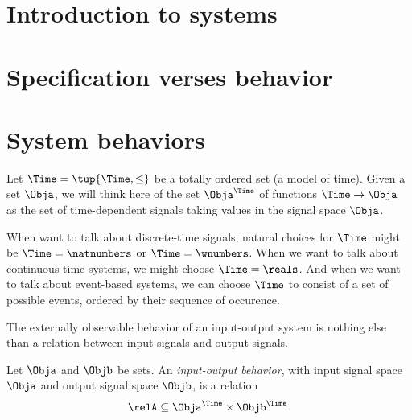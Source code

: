 
\section{Introduction to systems}



\section{Specification verses behavior}




\section{System behaviors}


Let $\Time = \tup{\Time, \leq}$ be a totally ordered set (a model of time). Given a set $\Obja$, we will think here of the set $\Obja^\Time$ of functions $\Time \to \Obja$ as the set of time-dependent signals taking values in the signal space $\Obja$. 

When want to talk about discrete-time signals, natural choices for $\Time$ might be $\Time = \natnumbers$ or $\Time = \wnumbers$. When we want to talk about continuous time systems, we might choose $\Time = \reals$. And when we want to talk about event-based systems, we can choose $\Time$ to consist of a set of possible events, ordered by their sequence of occurence. 

The externally observable behavior of an input-output system is nothing else than a relation between input signals and output signals. 

\begin{definition}
Let $\Obja$ and $\Objb$ be sets. An \emph{input-output behavior}, with input signal space $\Obja$ and output signal space $\Objb$, is a relation 
\begin{equation}
\relA \subseteq \Obja^\Time \times \Objb^\Time. 
\end{equation}
\end{definition}

